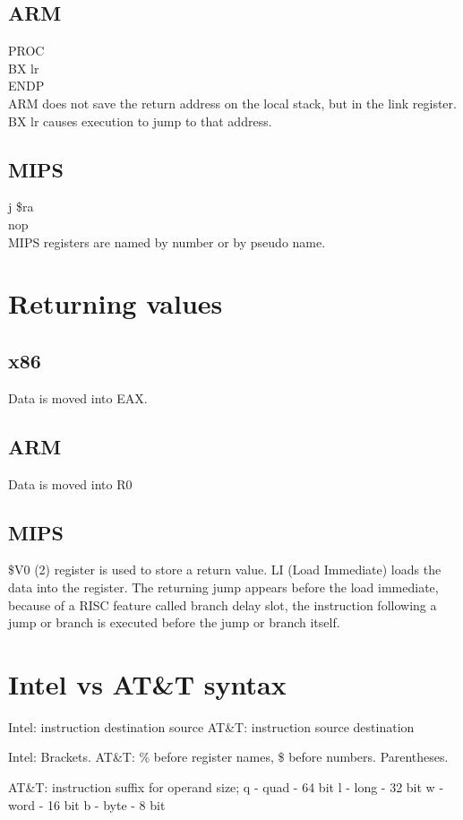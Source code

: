 \documentclass[11pt, a4paper, draft]{article}
\begin{document}
		\subsection*{ARM}
		PROC\\
		BX lr\\
		ENDP\\
		ARM does not save the return address on the local stack, but in the link register. BX lr causes execution to jump to that address.
		
		\subsection*{MIPS}
		j \$ra\\
		nop\\
		MIPS registers are named by number or by pseudo name.
	
	\section*{Returning values}
		\subsection*{x86}
		Data is moved into EAX.
		\subsection*{ARM}
		Data is moved into R0
		\subsection*{MIPS}
		\$V0 (2) register is used to store a return value. LI (Load Immediate) loads the data into the register.
		The returning jump appears before the load immediate, because of a RISC feature called branch delay slot, the instruction following a jump or branch is executed before the jump or branch itself.
	
	\section*{Intel vs AT\&T syntax}
	Intel: instruction destination source
	AT\&T: instruction source destination
	
	Intel: Brackets.
	AT\&T: \% before register names, \$ before numbers. Parentheses.
	
	AT\&T: instruction suffix for operand size;
	q - quad - 64 bit
	l - long - 32 bit
	w - word - 16 bit
	b - byte - 8 bit
	
\end{document}
